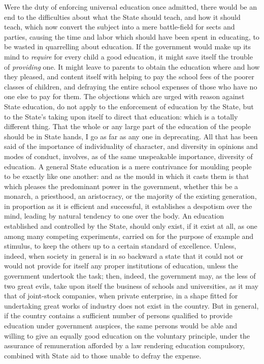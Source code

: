 \documentclass[12pt]{report}
\begin{document}
Were the duty of enforcing universal education once admitted, there would be an end to the difficulties about what the State should teach, and how it should teach, which now convert the subject into a mere battle-field for sects and parties, causing the time and labor which should have been spent in educating, to be wasted in quarrelling about education. If the government would make up its mind to \emph{require} for every child a good education, it might save itself the trouble of \emph{providing} one. It might leave to parents to obtain the education where and how they pleased, and content itself with helping to pay the school fees of the poorer classes of children, and defraying the entire school expenses of those who have no one else to pay for them. The objections which are urged with reason against State education, do not apply to the enforcement of education by the State, but to the State's taking upon itself to direct that education: which is a totally different thing. That the whole or any large part of the education of the people should be in State hands, I go as far as any one in deprecating. All that has been said of the importance of individuality of character, and diversity in opinions and modes of conduct, involves, as of the same unspeakable importance, diversity of education. A general State education is a mere contrivance for moulding people to be exactly like one another: and as the mould in which it casts them is that which pleases the predominant power in the government, whether this be a monarch, a priesthood, an aristocracy, or the majority of the existing generation, in proportion as it is efficient and successful, it establishes a despotism over the mind, leading by natural tendency to one over the body. An education established and controlled by the State, should only exist, if it exist at all, as one among many competing experiments, carried on for the purpose of example and stimulus, to keep the others up to a certain standard of excellence. Unless, indeed, when society in general is in so backward a state that it could not or would not provide for itself any proper institutions of education, unless the government undertook the task; then, indeed, the government may, as the less of two great evils, take upon itself the business of schools and universities, as it may that of joint-stock companies, when private enterprise, in a shape fitted for undertaking great works of industry does not exist in the country. But in general, if the country contains a sufficient number of persons qualified to provide education under government auspices, the same persons would be able and willing to give an equally good education on the voluntary principle, under the assurance of remuneration afforded by a law rendering education compulsory, combined with State aid to those unable to defray the expense.
\end{document}
